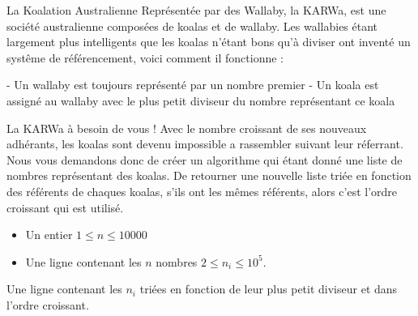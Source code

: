 \problemname{\problemyamlname}

La Koalation Australienne Représentée par des Wallaby, la KARWa, est une société australienne
composées de koalas et de wallaby. Les wallabies étant largement plus intelligents que les koalas n'étant bons qu'à diviser ont inventé un systême de
référencement, voici comment il fonctionne :

 - Un wallaby est toujours représenté par un nombre premier
 - Un koala est assigné au wallaby avec le plus petit diviseur du nombre représentant ce koala

La KARWa à besoin de vous ! Avec le nombre croissant de ses nouveaux adhérants, les koalas sont devenu impossible a rassembler suivant leur réferrant.
Nous vous demandons donc de créer un algorithme qui étant donné une liste de nombres représentant des koalas. De retourner une nouvelle liste
triée en fonction des référents de chaques koalas, s'ils ont les mêmes référents, alors c'est l'ordre croissant qui est utilisé.

\begin{Input}
	\begin{itemize}
		\item Un entier $1 \leq n \leq 10 000$
		\item Une ligne contenant les $n$ nombres $2 \leq n_i \leq 10^5$.
	\end{itemize}
\end{Input}

\begin{Output}
	Une ligne contenant les $n_i$ triées en fonction de leur plus petit diviseur et dans l'ordre croissant.
\end{Output}
